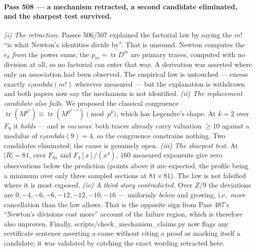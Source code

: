 \documentclass[12pt,a4paper]{article}
\def\mathbb#1{#1}%
\def\textbf#1{#1}%
\def\texttt#1{#1}%
\def\lambda{lambda}%
\theoremstyle{definition}
\newcommand{\FF}{\mathbb{F}}
\newcommand{\ZZ}{\mathbb{Z}}
\begin{document}
\paragraph{Pass 508 --- a mechanism retracted, a second candidate eliminated,
and the sharpest test survived.}
\emph{(i) The retraction.}  Passes 506/507 explained the factorial law by
saying the $m!$ ``is what Newton's identities divide by''.  \textbf{That is
unsound.}  Newton computes the $e_k$ \emph{from} the power sums; the
$p_m=\operatorname{tr}D^m$ are primary traces, computed with no division at
all, so no factorial can enter that way.  A derivation was asserted where only
an association had been observed.  The empirical law is untouched --- excess
exactly $v_\lambda(m!)$ wherever measured --- but the explanation is withdrawn
and both papers now say the mechanism is not identified.  \emph{(ii) The
replacement candidate also fails.}  We proposed the classical congruence
$\operatorname{tr}(M^{p^k})\equiv\operatorname{tr}(M^{p^{k-1}})\pmod{p^k}$,
which has Legendre's shape.  At $k=2$ over $\FF_9$ it \emph{holds} --- and is
\emph{vacuous}: both traces already carry valuation $\ge10$ against a modulus
of $v_\lambda(9)=4$, so the congruence constrains nothing.  Two candidates
eliminated; the cause is genuinely open.  \emph{(iii) The sharpest test.}  At
$|R|=81$, over $\FF_{81}$ and $\FF_3[x]/(x^4)$, $160$ measured exponents give
\textbf{zero observations below the prediction} (points above it are expected,
the profile being a minimum over only three sampled sections at $81\times81$).
The law is not falsified where it is most exposed.  \emph{(iv) A third story
contradicted.}  Over $\ZZ/9$ the deviations are $0,-4,-6,-6,-12,-12,-10,-16$
--- uniformly \emph{below} and growing, i.e.\ \emph{more} cancellation than the
law allows.  That is the opposite sign from Pass 487's ``Newton's divisions
cost more'' account of the failure region, which is therefore also unproven.
Finally, \texttt{scripts/check\_mechanism\_claims.py} now flags any certificate
sentence asserting a cause without citing a proof or marking itself a
candidate; it was validated by catching the exact wording retracted here.
\end{document}
